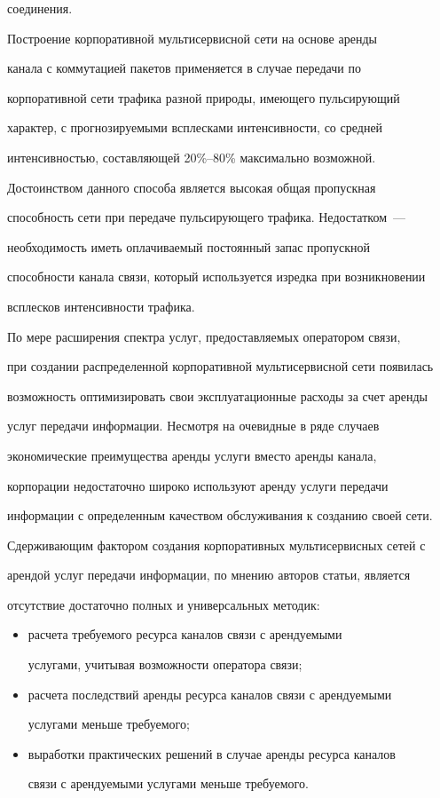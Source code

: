 соединения.


     


     Построение корпоративной мультисервисной сети на основе аренды 


канала с коммутацией пакетов применяется в случае передачи по 


корпоративной сети трафика разной природы, имеющего пульсирующий 


характер, с прогнозируемыми всплесками интенсивности, со средней 


интенсивностью, составляющей 20\%--80\% максимально возможной. 


Достоинством данного способа является высокая общая пропускная 


способность сети при передаче пульсирующего трафика. Недостатком~--- 


необходимость иметь оплачиваемый постоянный запас пропускной 


способности канала связи, который используется изредка при возникновении 


всплесков интенсивности трафика.


     


     По мере расширения спектра услуг, предоставляемых оператором связи, 


при создании распределенной корпоративной мультисервисной сети появилась 


возможность оптимизировать свои эксплуатационные расходы за счет аренды 


услуг передачи информации. Несмотря на очевидные в ряде случаев 


экономические преимущества аренды услуги вместо аренды канала, 


корпорации недостаточно широко используют аренду услуги передачи 


информации с определенным качеством обслуживания к созданию своей сети. 


Сдерживающим фактором создания корпоративных мультисервисных сетей с 


арендой услуг передачи информации, по мнению авторов статьи, является 


отсутствие достаточно полных и универсальных методик: \label{metka}


     \begin{itemize}


\item расчета требуемого ресурса каналов связи с арендуемыми 


услугами, учитывая возможности оператора связи;


\item расчета последствий аренды ресурса каналов связи с арендуемыми 


услугами меньше требуемого;


\item выработки практических решений в случае аренды ресурса каналов 


связи с арендуемыми услугами меньше требуемого.


\end{itemize}





